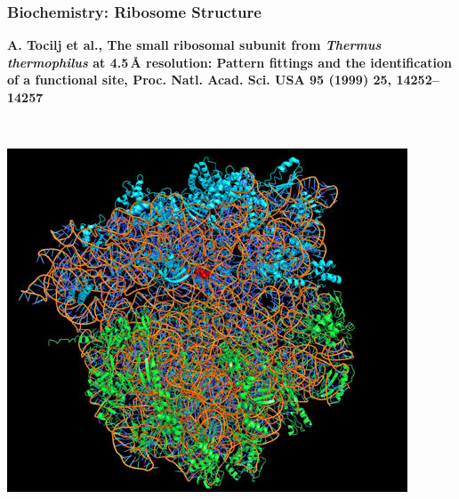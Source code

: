 \documentclass[10pt,t]{beamer}
\begin{document}
\begin{frame}
\frametitle{Biochemistry: Ribosome Structure}
\vspace*{-2.6\baselineskip}
\alert{\bfseries\footnotesize A. Tocilj et al., The small ribosomal subunit from \textit{Thermus thermophilus} at 4.5\,\AA{} resolution: Pattern fittings and the identification of a functional site, Proc. Natl. Acad. Sci. USA 95 (1999) 25, 14252--14257}
\vspace*{\baselineskip}
\begin{columns}
~\\[-\baselineskip]
    \includegraphics[width=\textwidth]{ribosom-struktur}
    \vspace*{-1ex}


\end{columns}
\end{frame}
\end{document}
